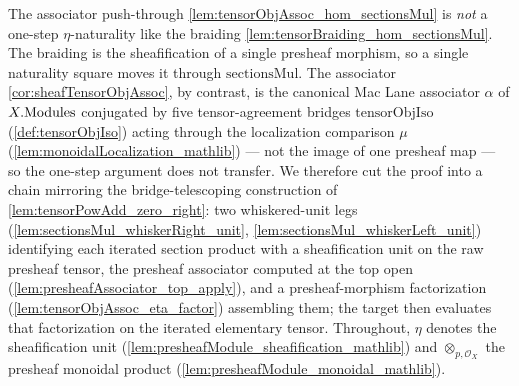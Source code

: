 The associator push-through \cref{lem:tensorObjAssoc_hom_sectionsMul} is \emph{not}
a one-step \(\eta\)-naturality like the braiding
\cref{lem:tensorBraiding_hom_sectionsMul}. The braiding is the sheafification of a
single presheaf morphism, so a single naturality square moves it through
\(\mathrm{sectionsMul}\). The associator \cref{cor:sheafTensorObjAssoc}, by
contrast, is the canonical Mac Lane associator \(\alpha\) of \(X.\mathrm{Modules}\)
conjugated by five tensor-agreement bridges \(\mathrm{tensorObjIso}\)
(\cref{def:tensorObjIso}) acting through the localization comparison \(\mu\)
(\cref{lem:monoidalLocalization_mathlib}) --- not the image of one presheaf map ---
so the one-step argument does not transfer. We therefore cut the proof into a chain
mirroring the bridge-telescoping construction of
\cref{lem:tensorPowAdd_zero_right}: two whiskered-unit legs
(\cref{lem:sectionsMul_whiskerRight_unit},
\cref{lem:sectionsMul_whiskerLeft_unit}) identifying each iterated section product
with a sheafification unit on the raw presheaf tensor, the presheaf associator
computed at the top open (\cref{lem:presheafAssociator_top_apply}), and a
presheaf-morphism factorization (\cref{lem:tensorObjAssoc_eta_factor}) assembling
them; the target then evaluates that factorization on the iterated elementary
tensor. Throughout, \(\eta\) denotes the sheafification unit
(\cref{lem:presheafModule_sheafification_mathlib}) and \(\otimes_{p,\mathcal{O}_X}\)
the presheaf monoidal product (\cref{lem:presheafModule_monoidal_mathlib}).

